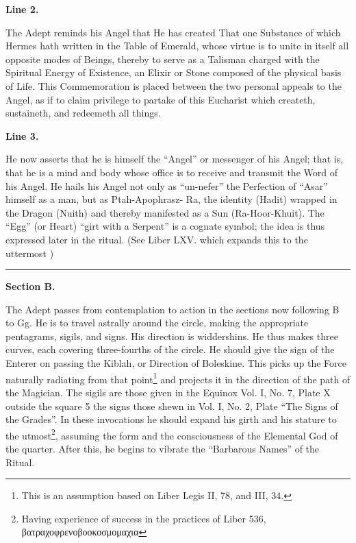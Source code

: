 \textbf{Line 2.}


The Adept reminds his Angel that He has created That one Substance of which Hermes hath written in the Table of Emerald, whose virtue is to unite in itself all opposite modes of Beings, thereby to serve as a Talisman charged with the Spiritual Energy of Existence, an Elixir or Stone composed of the physical basis of Life. This Commemoration is placed between the two personal appeals to the Angel, as if to claim privilege to partake of this Eucharist which createth, sustaineth, and redeemeth all things.


\textbf{Line 3.}

He now asserts that he is himself the \enquote{Angel} or messenger of his Angel; that is, that he is a mind and body whose office is to receive and transmit the Word of his Angel. He hails his Angel not only as \enquote{un-nefer} the Perfection of \enquote{Asar} himself as a man, but as Ptah-Apophrasz- Ra, the identity (Hadit) wrapped in the Dragon (Nuith) and thereby manifested as a Sun (Ra-Hoor-Khuit). The \enquote{Egg} (or Heart) \enquote{girt with a Serpent} is a cognate symbol; the idea is thus expressed later in the ritual. (See Liber LXV. which expands this to the uttermost )

\begin{center}
\rule{1in}{0.5pt}
\end{center}

\pagebreak[1]
\textbf{Section B.}

The Adept passes from contemplation to action in the sections now following B to Gg. He is to travel astrally around the circle, making the appropriate pentagrams, sigils, and signs. His direction is widdershins. He thus makes three curves, each covering three-fourths of the circle. He should give the sign of the Enterer on passing the Kiblah, or Direction of Boleskine. This picks up the Force naturally radiating from that point\footnote{This is an assumption based on Liber Legis II, 78, and III, 34.} and projects it in the direction of the path of the Magician. The sigils are those given in the Equinox Vol. I, No. 7, Plate X outside the square 5 the signs those shewn in Vol. I, No. 2, Plate \enquote{The Signs of the Grades}. In these invocations he should expand his girth and his stature to the utmost\footnote{Having experience of success in the practices of Liber 536, \textgreek{βατραχοφρενοβοοκοσμομαχια}\footnotemark}, assuming the form and the consciousness of the Elemental God of the quarter. After this, he begins to vibrate the \enquote{Barbarous Names} of the Ritual.

